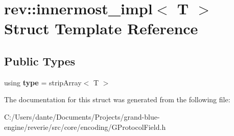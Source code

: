 \hypertarget{structrev_1_1innermost__impl}{}\section{rev\+::innermost\+\_\+impl$<$ T $>$ Struct Template Reference}
\label{structrev_1_1innermost__impl}
\subsection*{Public Types}
\begin{DoxyCompactItemize}
\item 
\mbox{\label{structrev_1_1innermost__impl_acc883f9eddb749e337a3473d7261b6cf}} 
using {\bfseries type} = strip\+Array$<$ T $>$
\end{DoxyCompactItemize}


The documentation for this struct was generated from the following file\+:\begin{DoxyCompactItemize}
\item 
C\+:/\+Users/dante/\+Documents/\+Projects/grand-\/blue-\/engine/reverie/src/core/encoding/G\+Protocol\+Field.\+h\end{DoxyCompactItemize}
